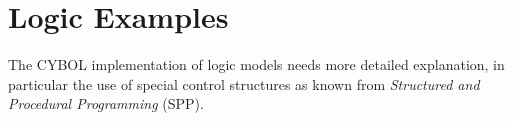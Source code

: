 %
%
%
%
%
%

\section{Logic Examples}
\label{logic_examples_heading}

The CYBOL implementation of logic models needs more detailed explanation, in
particular the use of special control structures as known from
\emph{Structured and Procedural Programming} (SPP).






